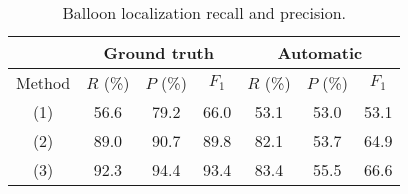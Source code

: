 \documentclass[conference]{IEEEtran}
\begin{document}
\begin{table}[ht]
	\normalsize
\renewcommand{\arraystretch}{1.3}
	\centering
	\caption{Balloon localization recall and precision.}
	\begin{tabular}{|c|c|c|c|c|c|c|}
	\hline

		& \multicolumn{3}{|c|}{Ground truth} 	& \multicolumn{3}{|c|}{Automatic}		\\
	\hline
	Method	&  $ R$ (\%)  & $P$ (\%)& $F_1$  	&  $R$ (\%)  & $P$ (\%) 	& $F_1$\\

	\hline
	(1) 		& 56.6     & 79.2 	& 66.0	& 53.1     & 53.0	& 53.1		\\
	\hline
	(2)		& 89.0	&90.7 	& 89.8	& 82.1	& 53.7    & 64.9	\\
	\hline
	(3)		& 92.3	& 94.4 	& 93.4	& 83.4	& 55.5    & 66.6	\\
	\hline
	\end{tabular}
      \label{tab:bal_loc}
\end{table}%
\end{document}
